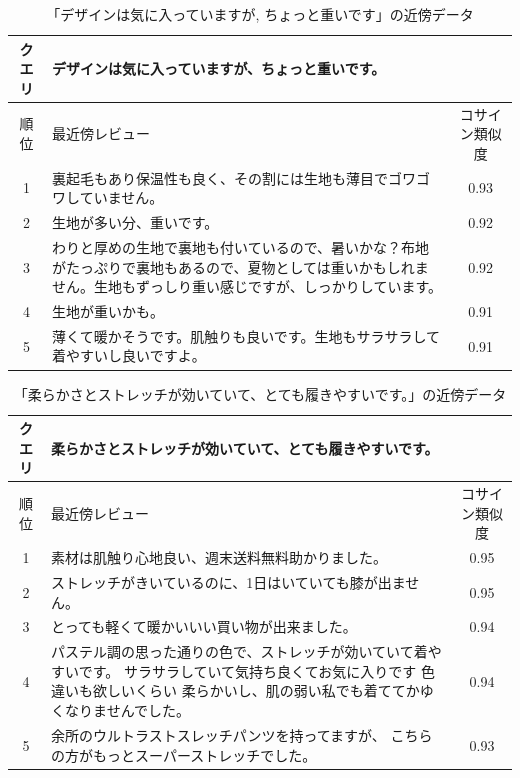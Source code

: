 \documentclass[a4paper,12pt]{jreport}
\begin{document}
\begin{table}[tbh]
\begin{center}
\caption{「デザインは気に入っていますが, ちょっと重いです」の近傍データ}
\vspace{7mm}
\label{tab:6.2}
\begin{tabular}{|c|p{9cm}|c|}
\hline
クエリ &
\multicolumn{2}{p{11cm}|}{デザインは気に入っていますが、ちょっと重いです。}
\\ \hline
順位 & 最近傍レビュー & コサイン類似度 \\ \hline
1 & 裏起毛もあり保温性も良く、その割には生地も薄目でゴワゴワしていません。 & 0.93 \\ \hline
2 & 生地が多い分、重いです。 & 0.92 \\ \hline
3 & わりと厚めの生地で裏地も付いているので、暑いかな？布地がたっぷりで裏地もあるので、夏物としては重いかもしれません。生地もずっしり重い感じですが、しっかりしています。 & 0.92 \\ \hline
4 & 生地が重いかも。 & 0.91 \\ \hline
5 & 薄くて暖かそうです。肌触りも良いです。生地もサラサラして着やすいし良いですよ。 & 0.91 \\ \hline
\end{tabular}
\end{center}
\end{table}

\begin{table}[tbh]
\begin{center}
\caption{「柔らかさとストレッチが効いていて、とても履きやすいです。」の近傍データ}
\vspace{7mm}
\label{tab:6.3}
\begin{tabular}{|c|p{9cm}|c|}
\hline
クエリ &
\multicolumn{2}{p{11cm}|}{柔らかさとストレッチが効いていて、とても履きやすいです。}
\\ \hline
順位 & 最近傍レビュー & コサイン類似度 \\ \hline
1 &素材は肌触り心地良い、週末送料無料助かりました。 & 0.95 \\ \hline
2 & ストレッチがきいているのに、1日はいていても膝が出ません。 & 0.95 \\ \hline
3 & とっても軽くて暖かいいい買い物が出来ました。 & 0.94 \\ \hline
4 & パステル調の思った通りの色で、ストレッチが効いていて着やすいです。 サラサラしていて気持ち良くてお気に入りです 色違いも欲しいくらい 柔らかいし、肌の弱い私でも着ててかゆくなりませんでした。 & 0.94 \\ \hline
5 &余所のウルトラストスレッチパンツを持ってますが、 こちらの方がもっとスーパーストレッチでした。 & 0.93 \\ \hline
\end{tabular}
\end{center}
\end{table}
\end{document}
